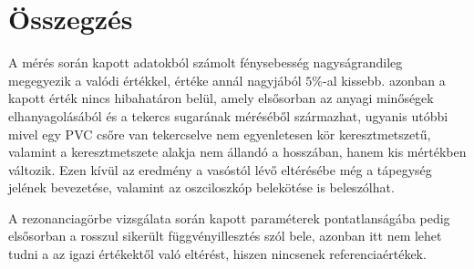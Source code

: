 \documentclass[10pt,pdftex]{report}
\begin{document}
\section*{Összegzés}
A mérés során kapott adatokból számolt fénysebesség nagyságrandileg megegyezik a valódi értékkel, értéke annál nagyjából $5\%$-al kissebb.
azonban a kapott érték  nincs hibahatáron belül, amely elsősorban az anyagi minőségek elhanyagolásából és a tekercs sugarának méréséből származhat, ugyanis 
utóbbi mivel egy PVC csőre van tekercselve nem egyenletesen kör keresztmetszetű, valamint a keresztmetszete alakja nem állandó a hosszában, hanem kis mértékben változik.
Ezen kívül az eredmény a vasóstól lévő eltérésébe még a tápegység jelének bevezetése, valamint az oszciloszkóp belekötése is beleszólhat.


A rezonanciagörbe vizsgálata során kapott paraméterek pontatlanságába pedig elsősorban a rosszul sikerült függvényillesztés szól bele, azonban itt nem lehet tudni a 
az igazi értékektől való eltérést, hiszen nincsenek referenciaértékek.


\end{document}
